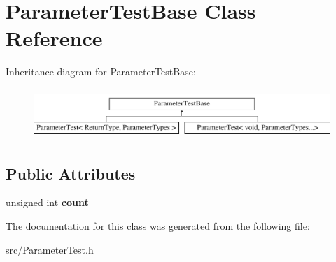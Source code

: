 \hypertarget{class_parameter_test_base}{\section{Parameter\-Test\-Base Class Reference}
\label{class_parameter_test_base}
}
Inheritance diagram for Parameter\-Test\-Base\-:\begin{figure}[H]
\begin{center}
\leavevmode
\includegraphics[height=1.924399cm]{class_parameter_test_base}
\end{center}
\end{figure}
\subsection*{Public Attributes}
\begin{DoxyCompactItemize}
\item 
\hypertarget{class_parameter_test_base_a620f88274dad660ba98e9b2842f9655b}{unsigned int {\bfseries count}}\label{class_parameter_test_base_a620f88274dad660ba98e9b2842f9655b}

\end{DoxyCompactItemize}


The documentation for this class was generated from the following file\-:\begin{DoxyCompactItemize}
\item 
src/Parameter\-Test.\-h\end{DoxyCompactItemize}
